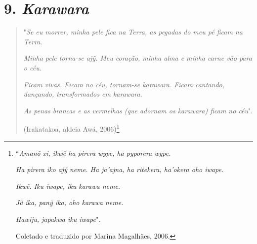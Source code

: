 
\chapter{9. \emph{Karawara}}\label{karawara}

\begin{quote}
"\emph{Se eu morrer, minha pele fica na Terra, as pegadas do meu pé
ficam na Terra}.

\emph{Minha pele torna-se ajỹ. Meu coração, minha alma e minha carne vão
para o céu.}

\emph{Ficam vivas. Ficam no céu, tornam-se karawara. Ficam cantando,
dançando, transformados em karawara.}

\emph{As penas brancas e as vermelhas (que adornam os karawara) ficam no
céu}".

(Irakatakoa, aldeia Awá, 2006)\footnote{``\emph{Amanõ xi, ikwẽ ha pirera
  wype, ha pyporera wype.}

  \emph{Ha pirera iko ajỹ neme. Ha ja'ajna, ha ritekera, ha'okera oho
  iwape.}

  \emph{Ikwẽ. Iku iwape, iku karawa neme.}

  \emph{Jã ika, panỹ ika, oho karawa neme.}

  \emph{Hawiju, japakwa iku iwape}".

  Coletado e traduzido por Marina Magalhães, 2006.}
\end{quote}

